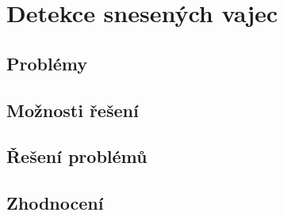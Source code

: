 \section{Detekce snesených vajec}\label{sec:detekce-snesenych-vajec}
\subsection{Problémy}\label{subsec:detekce-snesenych-vajec-problemy}
\subsection{Možnosti řešení}\label{subsec:detekce-snesenych-vajec-moznosti-reseni}
\subsection{Řešení problémů}\label{subsec:detekce-snesenych-vajec-reseni-problemu}
\subsection{Zhodnocení}\label{subsec:detekce-snesenych-vajec-zhodnoceni}